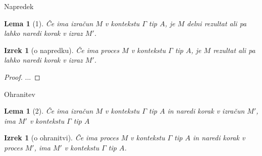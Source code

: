 \documentclass{beamer}
\theoremstyle{definition} %
\theoremstyle{plain} %
\newtheorem{lema}[definicija]{Lema}
\newtheorem{izrek}[definicija]{Izrek}
\begin{document}
	

	
	\begin{frame}{Napredek}
		\begin{lema}[1]
			Če ima izračun $M$ v kontekstu $\Gamma$ tip $A$, je $M$ delni rezultat ali pa lahko naredi korak v izraz $M'$.
		\end{lema}
		
		
					
		\begin{izrek}[o napredku]
			Če ima proces $M$ v kontekstu $\Gamma$ tip $A$, je $M$ rezultat ali pa lahko naredi korak v izraz $M'$.
		\end{izrek}
		
		\begin{proof}
			... 
		\end{proof}
		
	\end{frame}

	
		
	\begin{frame}{Ohranitev}
			
		\begin{lema}[2]
			Če ima izračun $M$ v kontekstu $\Gamma$ tip $A$ in naredi korak v izračun $M'$, ima $M'$ v kontekstu $\Gamma$ tip $A$
		\end{lema}	
				
		\begin{izrek}[o ohranitvi]
			Če ima proces $M$ v kontekstu $\Gamma$ tip $A$ in naredi korak v proces $M'$, ima $M'$ v kontekstu $\Gamma$ tip $A$.
		\end{izrek}

	\end{frame}
\end{document}
